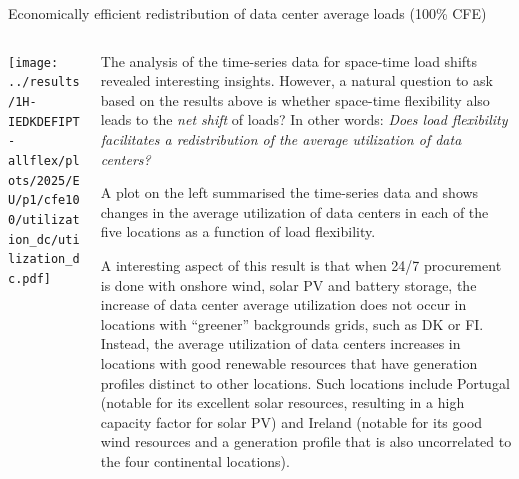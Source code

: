 \begin{frame}{{\normalsize Economically efficient redistribution of data center average loads (100\% CFE)}}
\label{ssec:redistribution}

  {\footnotesize
  
  \begin{columns}[T]
  \begin{column}{6cm}
    \centering
    \texttt{[image: ../results/1H-IEDKDEFIPT-allflex/plots/2025/EU/p1/cfe100/utilization\_dc/utilization\_dc.pdf]} 
  \end{column}

  \begin{column}{8.5cm}

  \vspace{0.3cm}
  The analysis of the time-series data for space-time load shifts revealed interesting insights. However, a natural question to ask based on the results above is whether space-time flexibility also leads to the \textit{net shift} of loads? In other words: \textit{Does load flexibility facilitates a redistribution of the average utilization of data centers?}
  
  \vspace{0.1cm}
  A plot on the left summarised the time-series data and shows changes in the \alert{average utilization} of data centers in each of the five locations as a function of load flexibility.

  \vspace{0.1cm}
  A interesting aspect of this result is that when 24/7 procurement is done with onshore wind, solar PV and battery storage, the increase of data center average utilization does not occur in locations with \enquote{greener} backgrounds grids, such as DK or FI. Instead, the average utilization of data centers increases in locations with \alert{good renewable resources} that have generation profiles distinct to other locations. Such locations include Portugal (notable for its excellent solar resources, resulting in a high capacity factor for solar PV) and Ireland (notable for its good wind resources and a generation profile that is also uncorrelated to the four continental locations). 

  \end{column}
  \end{columns}
  }
\end{frame}


